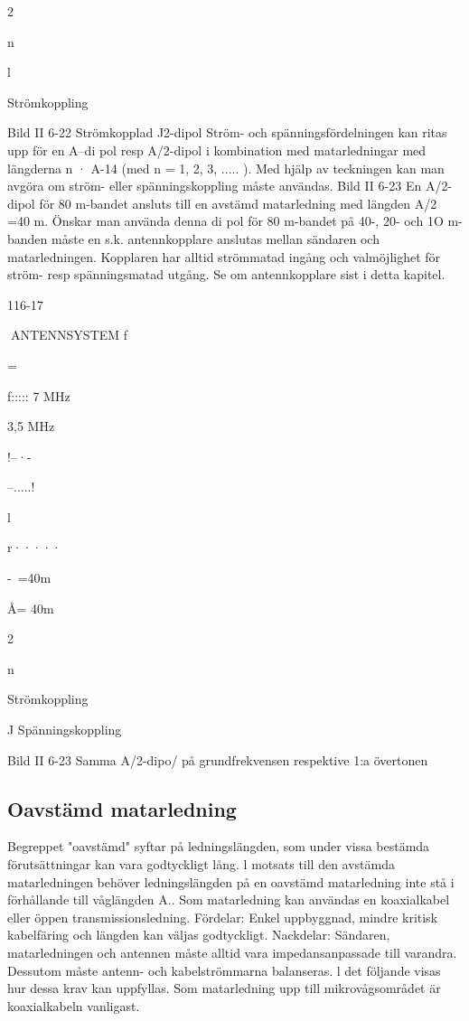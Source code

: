 2

n

l

Strömkoppling

Bild II 6-22 Strömkopplad J2-dipol
Ström- och spänningsfördelningen kan
ritas upp för en A--di pol resp A/2-dipol i kombination med matarledningar med längderna
n · A-14 (med n = 1, 2, 3, ..... ). Med hjälp av
teckningen kan man avgöra om ström- eller
spänningskoppling måste användas.
Bild II 6-23
En A/2-dipol för 80 m-bandet ansluts till
en avstämd matarledning med längden A/2
=40 m.
Önskar man använda denna di pol för 80
m-bandet på 40-, 20- och 1O m-banden
måste en s.k. antennkopplare anslutas mellan sändaren och matarledningen. Kopplaren har alltid strömmatad ingång och valmöjlighet för ström- resp spänningsmatad
utgång. Se om antennkopplare sist i detta
kapitel.

116-17

ANTENNSYSTEM
f

=

f::::: 7 MHz

3,5 MHz

!--·-

--.....!

l

r·····

-~=40m

Å= 40m

2

n

Strömkoppling

J
Spänningskoppling

Bild II 6-23 Samma A/2-dipo/ på grundfrekvensen respektive 1:a övertonen


\subsection{Oavstämd matarledning}

Begreppet "oavstämd" syftar på ledningslängden, som under vissa bestämda förutsättningar kan vara godtyckligt lång. l motsats till den avstämda matarledningen behöver ledningslängden på en oavstämd matarledning inte stå i förhållande till våglängden A.. Som matarledning kan användas en
koaxialkabel eller öppen transmissionsledning.
Fördelar: Enkel uppbyggnad, mindre kritisk kabelfäring och längden kan väljas godtyckligt.
Nackdelar: Sändaren, matarledningen
och antennen måste alltid vara impedansanpassade till varandra. Dessutom måste
antenn- och kabelströmmarna balanseras. l
det följande visas hur dessa krav kan uppfyllas.
Som matarledning upp till mikrovågsområdet är koaxialkabeln vanligast.


